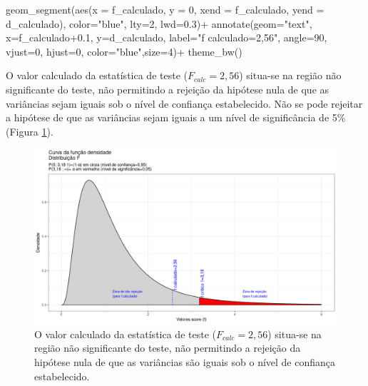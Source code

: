 \documentclass[
]{book}
\newenvironment{Shaded}{\begin{snugshade}}{\end{snugshade}}
\newcommand{\AttributeTok}[1]{\textcolor[rgb]{0.77,0.63,0.00}{#1}}
\newcommand{\DecValTok}[1]{\textcolor[rgb]{0.00,0.00,0.81}{#1}}
\newcommand{\FloatTok}[1]{\textcolor[rgb]{0.00,0.00,0.81}{#1}}
\newcommand{\FunctionTok}[1]{\textcolor[rgb]{0.00,0.00,0.00}{#1}}
\newcommand{\NormalTok}[1]{#1}
\newcommand{\SpecialCharTok}[1]{\textcolor[rgb]{0.00,0.00,0.00}{#1}}
\newcommand{\StringTok}[1]{\textcolor[rgb]{0.31,0.60,0.02}{#1}}
\begin{document}
\begin{Shaded}
\begin{Highlighting}[]
    \FunctionTok{geom\_segment}\NormalTok{(}\FunctionTok{aes}\NormalTok{(}\AttributeTok{x =}\NormalTok{ f\_calculado, }\AttributeTok{y =} \DecValTok{0}\NormalTok{, }\AttributeTok{xend =}\NormalTok{ f\_calculado, }\AttributeTok{yend =}\NormalTok{ d\_calculado), }\AttributeTok{color=}\StringTok{"blue"}\NormalTok{, }\AttributeTok{lty=}\DecValTok{2}\NormalTok{, }\AttributeTok{lwd=}\FloatTok{0.3}\NormalTok{)}\SpecialCharTok{+}
  \FunctionTok{annotate}\NormalTok{(}\AttributeTok{geom=}\StringTok{"text"}\NormalTok{, }\AttributeTok{x=}\NormalTok{f\_calculado}\FloatTok{+0.1}\NormalTok{, }\AttributeTok{y=}\NormalTok{d\_calculado, }\AttributeTok{label=}\StringTok{"f calculado=2,56"}\NormalTok{, }\AttributeTok{angle=}\DecValTok{90}\NormalTok{, }\AttributeTok{vjust=}\DecValTok{0}\NormalTok{, }\AttributeTok{hjust=}\DecValTok{0}\NormalTok{, }\AttributeTok{color=}\StringTok{"blue"}\NormalTok{,}\AttributeTok{size=}\DecValTok{4}\NormalTok{)}\SpecialCharTok{+}
  \FunctionTok{theme\_bw}\NormalTok{()}
\end{Highlighting}
\end{Shaded}

\hfill\break
O valor calculado da estatística de teste (\(F_{calc}=2,56\)) situa-se na região não significante do teste, não permitindo a rejeição da hipótese nula de que as variâncias sejam iguais sob o nível de confiança estabelecido. Não se pode rejeitar a hipótese de que as variâncias sejam iguais a um nível de significância de 5\% (Figura \ref{fig:fig88}).\\

\begin{figure}

{\centering \includegraphics[width=1\linewidth]{images11/f_test_3} 

}

\caption{O valor calculado da estatística de teste ($F_{calc}=2,56$) situa-se na região não significante do teste, não permitindo a rejeição da hipótese nula de que as variâncias são iguais sob o nível de confiança estabelecido.}\label{fig:fig88}
\end{figure}
\end{document}

